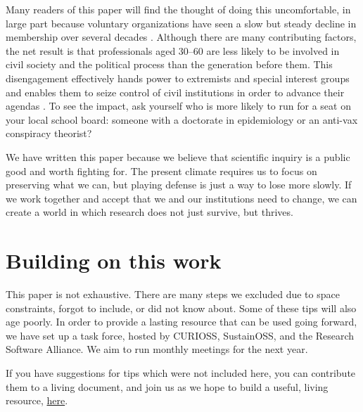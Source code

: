 \documentclass[10pt,letterpaper]{article}
\begin{document}
Many readers of this paper will find the thought of doing this uncomfortable,
in large part because 
voluntary organizations have seen a slow but steady decline in membership over several decades \cite{Putnam2020}.
Although there are many contributing factors,
the net result is that professionals aged 30--60
are less likely to be involved in civil society and the political process than the generation before them.
This disengagement effectively hands power to extremists and special interest groups
and enables them to seize control of civil institutions in order to advance their agendas \cite{BuenoDeMesquita2022}.
To see the impact,
ask yourself who is more likely to run for a seat on your local school board:
someone with a doctorate in epidemiology or an anti-vax conspiracy theorist?

We have written this paper because we believe that scientific inquiry is a public good and worth fighting for.
The present climate requires us to focus on preserving what we can,
but playing defense is just a way to lose more slowly.
If we work together and accept that we and our institutions need to change,
we can create a world in which research does not just survive,
but thrives.

\section*{Building on this work}

This paper is not exhaustive.
There are many steps we excluded due to space constraints,
forgot to include,
or did not know about.
Some of these tips will also age poorly.
In order to provide a lasting resource that can be used going forward,
we have set up a task force,
hosted by CURIOSS, SustainOSS, and the Research Software Alliance.
We aim to run monthly meetings for the next year.

If you have suggestions for tips which were not included here,
you can contribute them to a living document,
and join us as we hope to build a useful, living resource,
\href{https://www.researchsoft.org/tf-succession-planning/}{here}.


\end{document}
